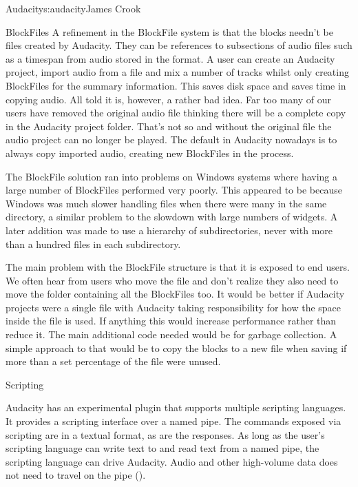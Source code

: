 \begin{aosachapter}{Audacity}{s:audacity}{James Crook}
\begin{aosasect1}{BlockFiles}
A refinement in the BlockFile system is that the blocks needn't be
files created by Audacity.  They can be references to subsections of
audio files such as a timespan from audio stored in the  format.
A user can create an Audacity project, import audio from a  file
and mix a number of tracks whilst only creating BlockFiles for the
summary information.  This saves disk space and saves time in copying
audio.  All told it is, however, a rather bad idea.  Far too many of
our users have removed the original audio  file thinking there
will be a complete copy in the Audacity project folder.  That's not so
and without the original  file the audio project can no longer be
played.  The default in Audacity nowadays is to always copy imported
audio, creating new BlockFiles in the process.

The BlockFile solution ran into problems on Windows systems where
having a large number of BlockFiles performed very poorly.  This appeared
to be because Windows was much slower handling
files when there were many in the same directory, a similar problem to
the slowdown with large numbers of widgets.  A later addition was made
to use a hierarchy of subdirectories, never with more than a hundred
files in each subdirectory.

The main problem with the BlockFile structure is that it is exposed to
end users.  We often hear from users who move the  file and don't
realize they also need to move the folder containing all the
BlockFiles too.  It would be better if Audacity projects were a single
file with Audacity taking responsibility for how the space inside the
file is used.  If anything this would increase performance rather than
reduce it.  The main additional code needed would be for garbage
collection.  A simple approach to that would be to copy the blocks to
a new file when saving if more than a set percentage of the file were
unused.

\end{aosasect1}

\begin{aosasect1}{Scripting}

Audacity has an experimental plugin that supports multiple scripting
languages.  It provides a scripting interface over a named pipe.  The
commands exposed via scripting are in a textual format, as are the
responses.  As long as the user's scripting language can write text to
and read text from a named pipe, the scripting language can drive
Audacity.  Audio and other high-volume data does not need to travel on
the pipe ().


\end{aosasect1}
\end{aosachapter}
